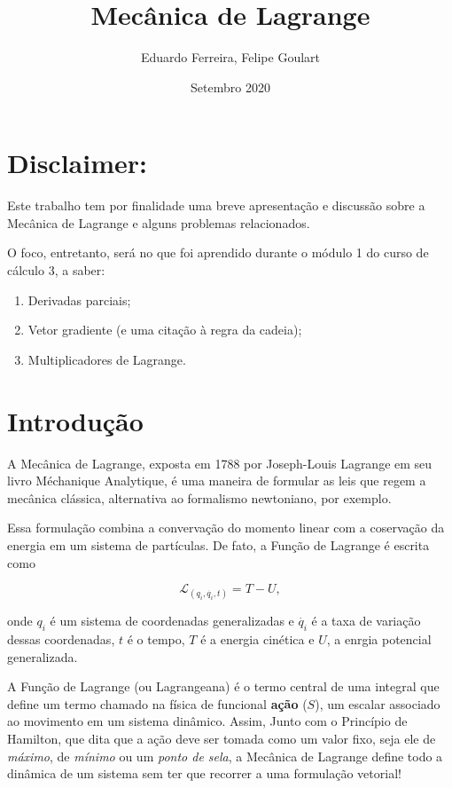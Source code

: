 \documentclass{article}
\title{Mecânica de Lagrange}
\author{Eduardo Ferreira, Felipe Goulart}
\date{Setembro 2020}
\begin{document}
\maketitle

\section{Disclaimer:}

Este trabalho tem por finalidade uma breve apresentação e discussão sobre a Mecânica de Lagrange e alguns problemas relacionados. 

O foco, entretanto, será no que foi aprendido durante o módulo 1 do curso de cálculo 3, a saber:
\begin{enumerate}
    \item Derivadas parciais;
    \item Vetor gradiente (e uma citação à regra da cadeia);
    \item Multiplicadores de Lagrange.
\end{enumerate}

\section{Introdução}

A Mecânica de Lagrange, exposta em 1788 por Joseph-Louis Lagrange em seu livro Méchanique Analytique, é uma maneira de formular as leis que regem a mecânica clássica, alternativa ao formalismo newtoniano, por exemplo.

Essa formulação combina a convervação do momento linear com a coservação da energia em um sistema de partículas. De fato, a Função de Lagrange é escrita como

\begin{equation}
    \mathcal{L}_{(q_i,\dot{q_i},t)}= T - U ,
\end{equation}

onde $q_i$ é um sistema de coordenadas generalizadas e $\dot{q_i}$ é a taxa de variação dessas coordenadas, $t$ é o tempo, $T$ é a energia cinética e $U$, a enrgia potencial generalizada.

A Função de Lagrange (ou Lagrangeana) é o termo central de uma integral que define um termo chamado na física de funcional \textbf{ação} ($S$), um escalar associado ao movimento em um sistema dinâmico. Assim, Junto com o Princípio de Hamilton, que dita que a ação deve ser tomada como um valor fixo, seja ele de  \textit{máximo}, de \textit{mínimo} ou um \textit{ponto de sela}, a Mecânica de Lagrange define todo a dinâmica de um sistema sem ter que recorrer a uma formulação vetorial!
\end{document}
